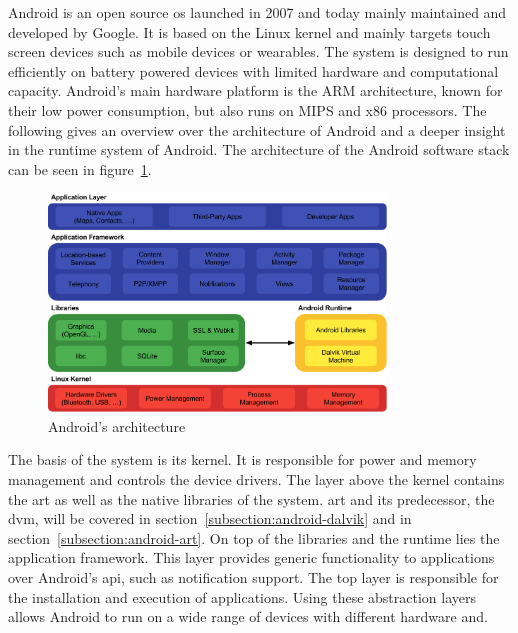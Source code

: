 Android is an open source \gls{os} launched in 2007 and today mainly maintained and developed by Google.
It is based on the Linux kernel and mainly targets touch screen devices such as mobile devices or wearables.
The system is designed to run efficiently on battery powered devices with limited hardware and computational capacity.
Android's main hardware platform is the ARM architecture, known for their low power consumption, but also runs on MIPS and x86 processors.
The following gives an overview over the architecture of Android and a deeper insight in the runtime system of Android.
The architecture of the Android software stack can be seen in figure~\ref{fig:androidArchitecture}.
\newline

\begin{figure}[h]
    \centering
    \includegraphics[width=0.8\textwidth]{data/stack.png}
    \caption{Android's architecture \cite{androidStack}}
    \label{fig:androidArchitecture}
\end{figure}

The basis of the system is its kernel.
It is responsible for power and memory management and controls the device drivers.
\newline
The layer above the kernel contains the \gls{art} as well as the native libraries of the system.
\gls{art} and its predecessor, the \gls{dvm}, will be covered in section~\ref{subsection:android-dalvik} and in section~\ref{subsection:android-art}.
\newline
On top of the libraries and the runtime lies the application framework.
This layer provides generic functionality to applications over Android's \gls{api}, such as notification support.
\newline
The top layer is responsible for the installation and execution of applications.
\newline
Using these abstraction layers allows Android to run on a wide range of devices with different hardware and.
